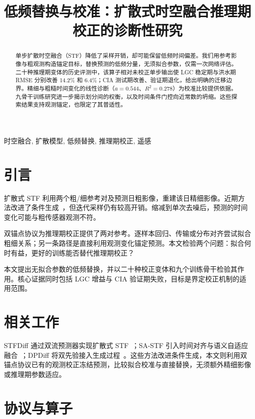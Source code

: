 \documentclass{article}
\title{低频替换与校准：扩散式时空融合推理期校正的诊断性研究}
\begin{document}
\ninept
\maketitle

\begin{abstract}
单步扩散时空融合（STF）降低了采样开销，却可能保留低频时间偏差。我们用参考影像与粗观测构造锚定目标，替换预测的低频分量，无须拟合参数，仅需一次网络评估。二十种推理期变体的历史评测中，该算子相对未校正单步输出使 LGC 稳定期与洪水期 RMSE 分别改善 14.2\% 和 6.4\%；CIA 测试期改善、验证期退化，给出明确的迁移边界。精细与粗糙时间变化的线性诊断（$a=0.544$、$R^2=0.278$）为校准比较提供依据。九骨干训练研究进一步揭示划分间的权衡，以及时间条件门控向近常数的坍缩。这些探索结果支持观测锚定，也限定了其普适性。
\end{abstract}
\begin{keywords}
时空融合, 扩散模型, 低频替换, 推理期校正, 遥感
\end{keywords}

\section{引言}
\label{sec:intro}
扩散式 STF 利用两个粗/细参考对及预测日粗影像，重建该日精细影像。近期方法改进了条件生成~\cite{huang2024stfdiff,zhang2026sastf,zhu2026dpdiff}，但迭代采样仍有较高开销。缩减到单次去噪后，预测的时间变化可能与粗传感器观测不符。

双锚点协议为推理期校正提供了两对参考。逐样本回归、传输或分布对齐尝试拟合粗细关系；另一条路径是直接利用观测变化锚定预测。本文检验两个问题：拟合何时有益，更好的训练能否替代推理期校正？

本文提出无拟合参数的低频替换，并以二十种校正变体和九个训练骨干检验其作用。核心证据同时包括 LGC 增益与 CIA 验证期失败，目标是界定校正机制的适用范围。

\section{相关工作}
\label{sec:related}
STFDiff 通过双流预测器实现扩散式 STF~\cite{huang2024stfdiff}；SA-STF 引入时间对齐与语义自适应融合~\cite{zhang2026sastf}；DPDiff 将双先验接入生成过程~\cite{zhu2026dpdiff}。这些方法改进条件生成，本文则利用双锚点协议已有的观测校正冻结预测，比较拟合校准与直接替换，无须额外精细影像或推理期参数适应。

\section{协议与算子}
\label{sec:method}
\end{document}
